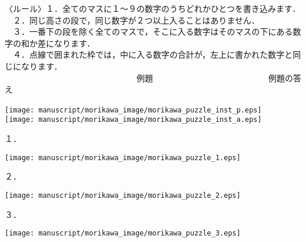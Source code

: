\documentclass[./main]{subfiles}
\begin{document}
\noindent 〈ルール〉１．全てのマスに１〜９の数字のうちどれかひとつを書き込みます．\\
　２．同じ高さの段で，同じ数字が２つ以上入ることはありません．\\
　３．一番下の段を除く全てのマスで，そこに入る数字はそのマスの下にある数字の和か差になります．\\
　４．点線で囲まれた枠では，中に入る数字の合計が，左上に書かれた数字と同じになります．\\[15pt]
　　　　　　　　　　　　　　　　例題　　　　　　　　　　　　　　例題の答え
\begin{center}
\texttt{[image: manuscript/morikawa\_image/morikawa\_puzzle\_inst\_p.eps]}　　　　　
\texttt{[image: manuscript/morikawa\_image/morikawa\_puzzle\_inst\_a.eps]}
\end{center}
\begin{minipage}{0.4375\hsize}
\vspace{15pt}１．\vspace{-15pt}
\begin{center}
\texttt{[image: manuscript/morikawa\_image/morikawa\_puzzle\_1.eps]}
\end{center}
\vspace{15pt}２．\vspace{-15pt}
\begin{center}
\texttt{[image: manuscript/morikawa\_image/morikawa\_puzzle\_2.eps]}
\end{center}
\end{minipage}
\begin{minipage}{0.5625\hsize}
\vspace{15pt}３．\vspace{-15pt}
\begin{center}
\texttt{[image: manuscript/morikawa\_image/morikawa\_puzzle\_3.eps]}
\end{center}
\end{minipage}
\end{document}
